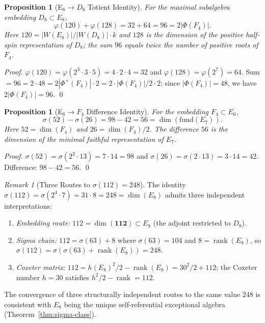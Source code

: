 \documentclass[11pt]{amsart}
\theoremstyle{plain}
\newtheorem{proposition}[theorem]{Proposition}
\theoremstyle{definition}
\theoremstyle{remark}
\newtheorem{remark}[theorem]{Remark}
\renewcommand{\Phi}{\varPhi}
\newcommand{\rank}{\operatorname{rank}}
\begin{document}
\begin{proposition}[E$_8 \to D_8$ Totient Identity]\label{prop:e8-d8-branch}
For the maximal subalgebra embedding $D_8 \subset E_8$,
\[
  \varphi(120) + \varphi(128) = 32 + 64 = 96 = 2|\Phi(F_4)|.
\]
Here $120 = |W(E_8)|/|W(D_8)| \cdot k$ and $128$ is the dimension of
the positive half-spin representation of $D_8$; the sum $96$ equals
twice the number of positive roots of $F_4$.
\end{proposition}

\begin{proof}
$\varphi(120) = \varphi(2^3 \cdot 3 \cdot 5) = 4 \cdot 2 \cdot 4 = 32$
and $\varphi(128) = \varphi(2^7) = 64$.  Sum $= 96 = 2 \cdot 48 = 2|\Phi^+(F_4)| \cdot 2 = 2 \cdot |\Phi(F_4)|/2 \cdot 2$;
since $|\Phi(F_4)| = 48$, we have $2|\Phi(F_4)| = 96$. \qed
\end{proof}

\begin{proposition}[E$_6 \to F_4$ Difference Identity]\label{prop:e6-f4-branch}
For the embedding $F_4 \subset E_6$,
\[
  \sigma(52) - \sigma(26) = 98 - 42 = 56 = \dim(\mathrm{fund}(E_7)).
\]
Here $52 = \dim(F_4)$ and $26 = \dim(F_4)/2$.  The difference $56$
is the dimension of the minimal faithful representation of $E_7$.
\end{proposition}

\begin{proof}
$\sigma(52) = \sigma(2^2 \cdot 13) = 7 \cdot 14 = 98$ and
$\sigma(26) = \sigma(2 \cdot 13) = 3 \cdot 14 = 42$.
Difference: $98 - 42 = 56$. \qed
\end{proof}

\begin{remark}[Three Routes to $\sigma(112) = 248$]\label{rem:sigma112}
The identity $\sigma(112) = \sigma(2^4 \cdot 7) = 31 \cdot 8 = 248 = \dim(E_8)$
admits three independent interpretations:
\begin{enumerate}
\item \emph{Embedding route:} $112 = \dim(\mathbf{112}) \subset E_8$
  (the adjoint restricted to $D_8$).
\item \emph{Sigma chain:} $112 = \sigma(63) + 8$ where $\sigma(63) = 104$
  and $8 = \rank(E_8)$, so $\sigma(112) = \sigma(\sigma(63) + \rank(E_8)) = 248$.
\item \emph{Coxeter matrix:} $112 = h(E_8)^2/2 - \rank(E_8) = 30^2/2 + 112$;
  the Coxeter number $h = 30$ satisfies $h^2/2 - \rank = 112$.
\end{enumerate}
The convergence of three structurally independent routes to the same
value $248$ is consistent with $E_8$ being the unique self-referential
exceptional algebra (Theorem~\ref{thm:sigma-class}).
\end{remark}
\end{document}
